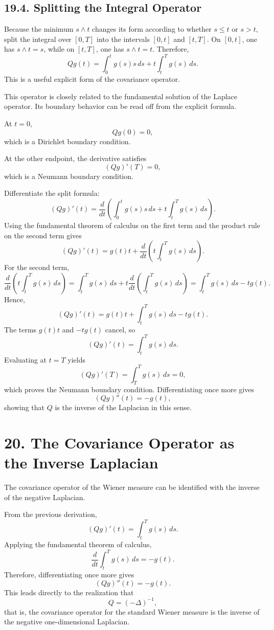 \documentclass[11pt]{article}
\theoremstyle{definition}
\theoremstyle{remark}
\begin{document}
\subsection*{19.4. Splitting the Integral Operator}
Because the minimum $s\wedge t$ changes its form according to whether $s\le t$ or $s>t$, split the integral over $[0,T]$ into the intervals $[0,t]$ and $[t,T]$. On $[0,t]$, one has $s\wedge t=s$, while on $[t,T]$, one has $s\wedge t=t$. Therefore,
\[
Qg(t)
=
\int_0^t g(s)s\,ds+t\int_t^T g(s)\,ds.
\]
This is a useful explicit form of the covariance operator.

This operator is closely related to the fundamental solution of the Laplace operator. Its boundary behavior can be read off from the explicit formula.

At $t=0$,
\[
Qg(0)=0,
\]
which is a Dirichlet boundary condition.

At the other endpoint, the derivative satisfies
\[
(Qg)'(T)=0,
\]
which is a Neumann boundary condition.

Differentiate the split formula:
\[
(Qg)'(t)
=
\frac{d}{dt}\left(\int_0^t g(s)s\,ds+t\int_t^T g(s)\,ds\right).
\]
Using the fundamental theorem of calculus on the first term and the product rule on the second term gives
\[
(Qg)'(t)
=
g(t)t+\frac{d}{dt}\left(t\int_t^T g(s)\,ds\right).
\]
For the second term,
\[
\frac{d}{dt}\left(t\int_t^T g(s)\,ds\right)
=
\int_t^T g(s)\,ds+t\frac{d}{dt}\left(\int_t^T g(s)\,ds\right)
=
\int_t^T g(s)\,ds-tg(t).
\]
Hence,
\[
(Qg)'(t)=g(t)t+\int_t^T g(s)\,ds-tg(t).
\]
The terms $g(t)t$ and $-tg(t)$ cancel, so
\[
(Qg)'(t)=\int_t^T g(s)\,ds.
\]
Evaluating at $t=T$ yields
\[
(Qg)'(T)=\int_T^T g(s)\,ds=0,
\]
which proves the Neumann boundary condition. Differentiating once more gives
\[
(Qg)''(t)=-g(t),
\]
showing that $Q$ is the inverse of the Laplacian in this sense.

\section*{20. The Covariance Operator as the Inverse Laplacian}
The covariance operator of the Wiener measure can be identified with the inverse of the negative Laplacian.

From the previous derivation,
\[
(Qg)'(t)=\int_t^T g(s)\,ds.
\]
Applying the fundamental theorem of calculus,
\[
\frac{d}{dt}\int_t^T g(s)\,ds=-g(t).
\]
Therefore, differentiating once more gives
\[
(Qg)''(t)=-g(t).
\]
This leads directly to the realization that
\[
Q=(-\Delta)^{-1},
\]
that is, the covariance operator for the standard Wiener measure is the inverse of the negative one-dimensional Laplacian.
\end{document}
